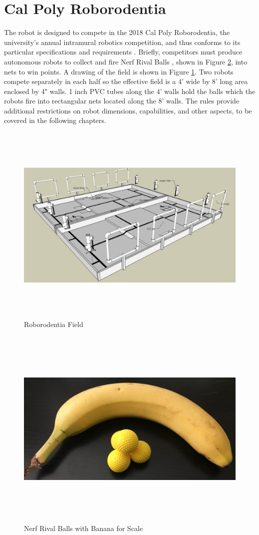 \section{Cal Poly Roborodentia}
The robot is designed to compete in the 2018 Cal Poly Roborodentia, the university's annual intramural robotics competition, and thus conforms to its particular specifications and requirements \cite{roborodentia}. Briefly, competitors must produce autonomous robots to collect and fire Nerf Rival Balls \cite{hasbro_2018}, shown in Figure \ref{fig:nerf_rival_balls}, into nets to win points. A drawing of the field is shown in Figure \ref{fig:roborodentia_field}. Two robots compete separately in each half so the effective field is a 4' wide by 8' long area enclosed by 4" walls. 1 inch PVC tubes along the 4' walls hold the balls which the robots fire into rectangular nets located along the 8' walls. The rules provide additional restrictions on robot dimensions, capabilities, and other aspects, to be covered in the following chapters.
\begin{figure}[H]   %
	\centering \includegraphics[width=6in, height=3.85in, keepaspectratio]{figures/roborodentia_field.png}
	\caption{Roborodentia Field \cite{roborodentia}}	\label{fig:roborodentia_field}
\end{figure}
\begin{figure}[H]   %
	\centering \includegraphics[width=6in, height=3.85in, keepaspectratio]{figures/nerf_rival_balls.jpg}
	\caption{Nerf Rival Balls with Banana for Scale}	\label{fig:nerf_rival_balls}
\end{figure}

